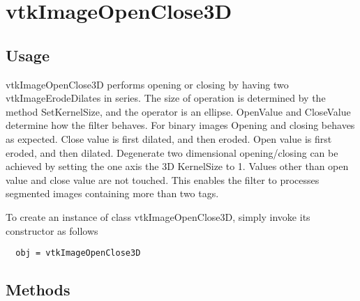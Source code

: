 \section{vtkImageOpenClose3D}

\subsection{Usage}

 vtkImageOpenClose3D performs opening or closing by having two 
 vtkImageErodeDilates in series.  The size of operation
 is determined by the method SetKernelSize, and the operator is an ellipse.
 OpenValue and CloseValue determine how the filter behaves.  For binary
 images Opening and closing behaves as expected.
 Close value is first dilated, and then eroded.
 Open value is first eroded, and then dilated.
 Degenerate two dimensional opening/closing can be achieved by setting the
 one axis the 3D KernelSize to 1.
 Values other than open value and close value are not touched.
 This enables the filter to processes segmented images containing more than
 two tags.

To create an instance of class vtkImageOpenClose3D, simply
invoke its constructor as follows
\begin{verbatim}
  obj = vtkImageOpenClose3D
\end{verbatim}
\subsection{Methods}

